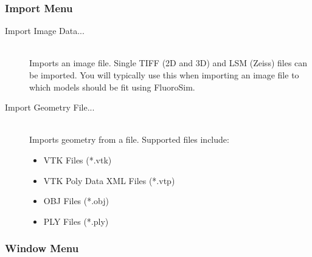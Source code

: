 \documentclass[11pt,titlepage]{article}
\begin{document}
\subsubsection{Import Menu}

\begin{description}

  \item[Import Image Data...] \hfill \\
  Imports an image file. Single TIFF (2D and 3D) and LSM (Zeiss) files can be imported. You will typically use this when importing an image file to which models should be fit using FluoroSim.
  
  \item[Import Geometry File...] \hfill \\
  Imports geometry from a file. Supported files include:
  
  \begin{itemize}
  \item VTK Files (*.vtk)
  \item VTK Poly Data XML Files (*.vtp)
  \item OBJ Files (*.obj)
  \item PLY Files (*.ply)
  \end{itemize}

\end{description}

\subsubsection{Window Menu}
\end{document}
